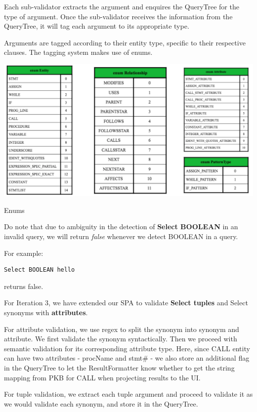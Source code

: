 \documentclass[12pt]{article}
\begin{document}
{{{{{{{{{{{{{\begin{figure}[H]
\end{figure}
Each sub-validator extracts the argument and enquires the QueryTree for the type of argument. Once the sub-validator receives the information from the QueryTree, it will tag each argument to its appropriate type.

Arguments are tagged according to their entity type, specific to their respective clauses. The tagging system makes use of enums. \newline
\begin{table}[H]
\includegraphics[width=1.0\textwidth]{Enums.png}
\caption{Enums}
\end{table}
Do note that due to ambiguity in the detection of \textbf{Select BOOLEAN} in an invalid query, we will return \textit{false} whenever we detect BOOLEAN in a query.

For example:
\begin{verbatim}
Select BOOLEAN hello
\end{verbatim}
returns false.

For Iteration 3, we have extended our SPA to validate \textbf{Select tuples} and Select synonyms with \textbf{attributes}. 

For attribute validation, we use regex to split the synonym into synonym and attribute. We first validate the synonym syntactically. Then we proceed with semantic validation for its corresponding attribute type. Here, since CALL entity can have two attributes - procName and stmt\# - we also store an additional flag in the QueryTree to let the ResultFormatter know whether to get the string mapping from PKB for CALL when projecting results to the UI.

For tuple validation, we extract each tuple argument and proceed to validate it as we would validate each synonym, and store it in the QueryTree.

}}}}}}}}}}}}}
\end{document}
